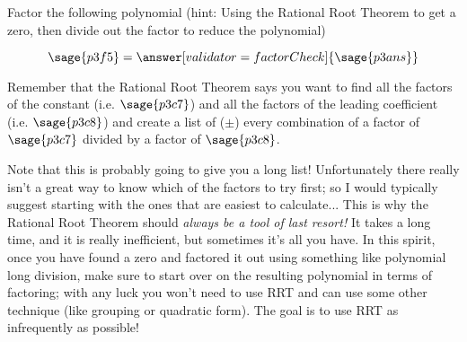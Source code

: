 \documentclass{ximera}
\begin{document}
\begin{problem}
    
    Factor the following polynomial (hint: Using the Rational Root Theorem to get a zero, then divide out the factor to reduce the polynomial)
    
    \[
        \sage{p3f5} = \answer[validator=factorCheck]{\sage{p3ans}}
    \]
    \begin{feedback}
        Remember that the Rational Root Theorem says you want to find all the factors of the constant (i.e. $\sage{p3c7}$) and all the factors of the leading coefficient (i.e. $\sage{p3c8}$) and create a list of ($\pm$) every combination of a factor of $\sage{p3c7}$ divided by a factor of $\sage{p3c8}$. 
        
        Note that this is probably going to give you a long list! Unfortunately there really isn't a great way to know which of the factors to try first; so I would typically suggest starting with the ones that are easiest to calculate... This is why the Rational Root Theorem should \textit{always be a tool of last resort!} It takes a long time, and it is really inefficient, but sometimes it's all you have. In this spirit, once you have found a zero and factored it out using something like polynomial long division, make sure to start over on the resulting polynomial in terms of factoring; with any luck you won't need to use RRT and can use some other technique (like grouping or quadratic form). The goal is to use RRT as infrequently as possible!
    \end{feedback}
    
\end{problem}
\end{document}
